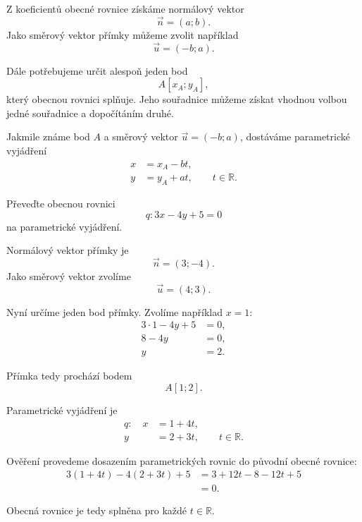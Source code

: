 Z koeficientů obecné rovnice získáme normálový vektor
\[
    \vec{n}=(a;b).
\]
Jako směrový vektor přímky můžeme zvolit například
\[
    \vec{u}=(-b;a).
\]

Dále potřebujeme určit alespoň jeden bod
\[
    A[x_A;y_A],
\]
který obecnou rovnici splňuje. Jeho souřadnice můžeme získat vhodnou
volbou jedné souřadnice a dopočítáním druhé.

Jakmile známe bod $A$ a směrový vektor $\vec{u}=(-b;a)$, dostáváme
parametrické vyjádření
\begin{equation}\label{eq:Conversion_general_to_parametric}
    \begin{aligned}
        x&=x_A-bt,\\
        y&=y_A+at,
        \qquad t\in\mathbb{R}.
    \end{aligned}
\end{equation}

\begin{example}\label{exa:Conversion_general_to_parametric}
    Převeďte obecnou rovnici
    \[
        q:3x-4y+5=0
    \]
    na parametrické vyjádření.

    Normálový vektor přímky je
    \[
        \vec{n}=(3;-4).
    \]
    Jako směrový vektor zvolíme
    \[
        \vec{u}=(4;3).
    \]

    Nyní určíme jeden bod přímky. Zvolíme například $x=1$:
    \begin{align*}
        3\cdot1-4y+5&=0,\\
        8-4y&=0,\\
        y&=2.
    \end{align*}

    Přímka tedy prochází bodem
    \[
        A[1;2].
    \]

    Parametrické vyjádření je
    \[
        \begin{aligned}
            q:\quad x&=1+4t,\\
                     y&=2+3t,
                     \qquad t\in\mathbb{R}.
        \end{aligned}
    \]

    Ověření provedeme dosazením parametrických rovnic do původní
    obecné rovnice:
    \begin{align*}
        3(1+4t)-4(2+3t)+5
        &=
        3+12t-8-12t+5\\
        &=
        0.
    \end{align*}

    Obecná rovnice je tedy splněna pro každé
    $t\in\mathbb{R}$.
\end{example}

